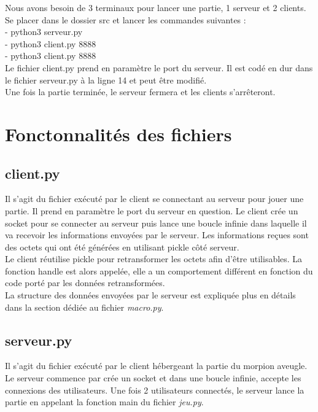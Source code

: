 \documentclass[11pt]{report}
\begin{document}
Nous avons besoin de 3 terminaux pour lancer une partie, 1 serveur et 2 clients.
Se placer dans le dossier src et lancer les commandes suivantes : \\
- python3 serveur.py \\
- python3 client.py 8888 \\
- python3 client.py 8888 \\
Le fichier client.py prend en paramètre le port du serveur. Il est codé en dur
dans le fichier serveur.py à la ligne 14 et peut être modifié. \\
Une fois la partie terminée, le serveur fermera et les clients s'arrêteront.



\newpage

\section{Fonctonnalités des fichiers}

\subsection{client.py}

Il s'agit du fichier exécuté par le client se connectant au serveur pour
jouer une partie. Il prend en paramètre le port du serveur en question.
Le client crée un socket pour se connecter au serveur puis lance une boucle
infinie dans laquelle il va recevoir les informations envoyées par le serveur.
Les informations reçues sont des octets qui ont été générées en utilisant pickle
côté serveur. \\
Le client réutilise pickle pour retransformer les octets afin d'être utilisables.
La fonction handle est alors appelée, elle a un comportement différent
en fonction du code porté par les données retransformées. \\
La structure des données envoyées par le serveur est expliquée plus en détails
dans la section dédiée au fichier \textit{macro.py}.

\subsection{serveur.py}

Il s'agit du fichier exécuté par le client hébergeant la partie du morpion
aveugle. Le serveur commence par crée un socket et dans une boucle infinie,
accepte les connexions des utilisateurs.
Une fois 2 utilisateurs connectés, le serveur lance la partie en appelant la
fonction main du fichier \textit{jeu.py}.
\end{document}
